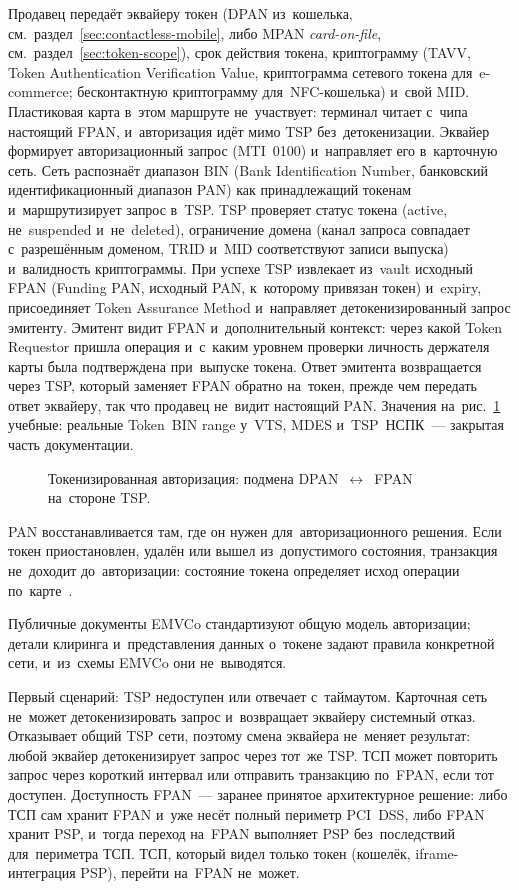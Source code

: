 Продавец передаёт эквайеру токен (DPAN из~кошелька,
  см.~раздел~\ref{sec:contactless-mobile}, либо MPAN \textit{card-on-file},
см.~раздел~\ref{sec:token-scope}), срок действия токена, криптограмму
(TAVV, Token Authentication Verification Value, криптограмма сетевого токена
для~e-commerce; бесконтактную криптограмму для~NFC-кошелька) и~свой MID.
Пластиковая карта в~этом маршруте не~участвует: терминал читает с~чипа
настоящий FPAN, и~авторизация идёт мимо TSP без~детокенизации. Эквайер
формирует авторизационный запрос (MTI~0100) и~направляет его в~карточную сеть.
Сеть распознаёт диапазон BIN (Bank Identification Number, банковский
идентификационный диапазон PAN) как принадлежащий токенам и~маршрутизирует
запрос в~TSP. TSP проверяет статус токена (active, не~suspended и~не~deleted),
ограничение домена (канал запроса совпадает с~разрешённым доменом, TRID и~MID
соответствуют записи выпуска) и~валидность криптограммы. При успехе TSP
извлекает из~vault исходный FPAN (Funding PAN, исходный PAN, к~которому
привязан токен) и~expiry, присоединяет Token Assurance Method и~направляет
детокенизированный запрос эмитенту. Эмитент видит FPAN и~дополнительный
контекст: через какой Token Requestor пришла операция и~с~каким уровнем
проверки личность держателя карты была подтверждена при~выпуске токена.
Ответ эмитента
возвращается через TSP, который заменяет FPAN обратно на~токен, прежде чем
передать ответ эквайеру, так что продавец не~видит настоящий PAN. Значения
на~рис.~\ref{fig:token-detokenization-flow} учебные: реальные Token~BIN range
у~VTS, MDES и~TSP~НСПК~--- закрытая часть документации.

\begin{figure}[t]
  \centering
  \caption{Токенизированная авторизация: подмена DPAN~$\leftrightarrow$~FPAN на~стороне TSP.}\label{fig:token-detokenization-flow}
\end{figure}

PAN восстанавливается там, где он нужен для~авторизационного решения. Если токен
приостановлен, удалён или вышел из~допустимого состояния, транзакция не~доходит
до~авторизации: состояние токена определяет исход операции
по~карте~\cite{emvco-payment-tokenisation,visa-vts}.

Публичные документы EMVCo стандартизуют общую модель авторизации; детали
клиринга и~представления данных о~токене задают правила конкретной сети, и~из~схемы
EMVCo они не~выводятся.

Первый сценарий: TSP недоступен или отвечает с~таймаутом. Карточная сеть
не~может детокенизировать запрос и~возвращает эквайеру системный отказ.
Отказывает общий TSP сети, поэтому смена эквайера не~меняет результат:
любой эквайер детокенизирует запрос через тот~же TSP. ТСП может повторить
запрос через короткий интервал или отправить транзакцию по~FPAN, если тот
доступен. Доступность FPAN~--- заранее принятое
архитектурное решение: либо ТСП сам хранит FPAN и~уже несёт полный периметр
PCI~DSS, либо FPAN хранит PSP, и~тогда переход на~FPAN выполняет PSP
без~последствий для~периметра ТСП. ТСП, который видел только токен
(кошелёк, iframe-интеграция PSP), перейти на~FPAN не~может.

